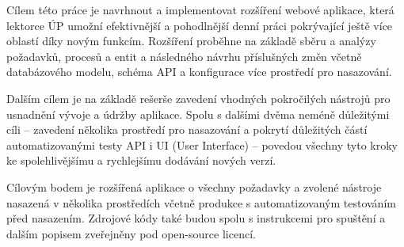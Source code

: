 Cílem této práce je navrhnout a implementovat rozšíření webové aplikace, která lektorce ÚP umožní efektivnější a pohodlnější denní práci pokrývající ještě více oblastí díky novým funkcím. Rozšíření proběhne na základě sběru a analýzy požadavků, procesů a entit a následného návrhu příslušných změn včetně databázového modelu, schéma API a konfigurace více prostředí pro nasazování.

Dalším cílem je na základě rešerše zavedení vhodných pokročilých nástrojů pro usnadnění vývoje a údržby aplikace. Spolu s dalšími dvěma neméně důležitými cíli -- zavedení několika prostředí pro nasazování a pokrytí důležitých částí automatizovanými testy API i UI (User Interface) -- povedou všechny tyto kroky ke spolehlivějšímu a rychlejšímu dodávání nových verzí.

Cílovým bodem je rozšířená aplikace o všechny požadavky a zvolené nástroje nasazená v několika prostředích včetně produkce s automatizovaným testováním před nasazením. Zdrojové kódy také budou spolu s instrukcemi pro spuštění a dalším popisem zveřejněny pod open-source licencí.

